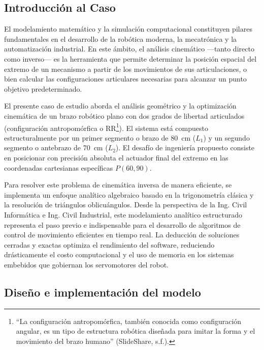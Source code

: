 \documentclass[12pt]{article}
\begin{document}
\subsection{Introducción al Caso}

El modelamiento matemático y la simulación computacional constituyen pilares fundamentales en el desarrollo de la robótica moderna, la mecatrónica y la automatización industrial. En este ámbito, el análisis cinemático —tanto directo como inverso— es la herramienta que permite determinar la posición espacial del extremo de un mecanismo a partir de los movimientos de sus articulaciones, o bien calcular las configuraciones articulares necesarias para alcanzar un punto objetivo predeterminado.

El presente caso de estudio aborda el análisis geométrico y la optimización cinemática de un brazo robótico plano con dos grados de libertad articulados (configuración antropomórfica o RR\footnote{``La configuración antropomórfica, también conocida como configuración angular, es un tipo de estructura robótica diseñada para imitar la forma y el movimiento del brazo humano'' (SlideShare, s.f.).}). El sistema está compuesto estructuralmente por un primer segmento o brazo de 80~cm ($L_1$) y un segundo segmento o antebrazo de 70~cm ($L_2$). El desafío de ingeniería propuesto consiste en posicionar con precisión absoluta el actuador final del extremo en las coordenadas cartesianas específicas $P(60, 90)$.

Para resolver este problema de cinemática inversa de manera eficiente, se implementa un enfoque analítico algebraico basado en la trigonometría clásica y la resolución de triángulos oblicuángulos. Desde la perspectiva de la Ing. Civil Informática e Ing. Civil Industrial, este modelamiento analítico estructurado representa el paso previo e indispensable para el desarrollo de algoritmos de control de movimiento eficientes en tiempo real. La deducción de soluciones cerradas y exactas optimiza el rendimiento del software, reduciendo drásticamente el costo computacional y el uso de memoria en los sistemas embebidos que gobiernan los servomotores del robot.

\newpage

\subsection{Diseño e implementación del modelo}
\end{document}
